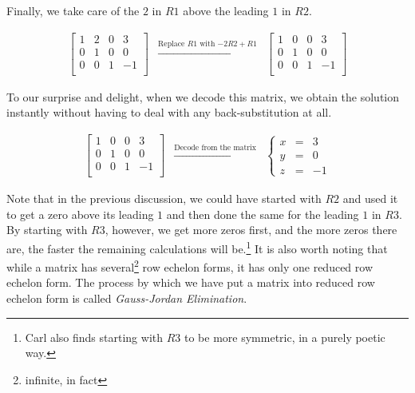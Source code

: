 Finally, we take care of the $2$ in $R1$ above the leading $1$ in $R2$.

\[ \begin{array}{ccc}

\left[ \begin{array}{rrr|r} 
1 & 2 & 0 & 3 \\ 
0 & 1 & 0 & 0 \\ 
0 & 0 &1 & -1 \\ 
\end{array} \right]   
& 
\xrightarrow{\text{Replace $R1$ with $-2R2+R1$}}
& 
\left[ \begin{array}{rrr|r} 
1 & 0 & 0 & 3 \\ 
0 & 1 & 0 & 0 \\ 
0 & 0 &1 & -1 \\ 
\end{array} \right]  

\end{array}\]

To our surprise and delight, when we decode this matrix, we obtain the solution instantly without having to deal with any back-substitution at all.

\[ \begin{array}{ccc}

\left[ \begin{array}{rrr|r} 
1 & 0 & 0 & 3 \\ 
0 & 1 & 0 & 0 \\ 
0 & 0 &1 & -1 \\ 
\end{array} \right]  
 
& 
\xrightarrow{\text{Decode from the matrix}} 
& 
\left\{ \begin{array}{rcr} 
x & = & 3 \\ 
y & = & 0 \\ 
z & = & -1 \end{array} \right.

\end{array}\]

Note that in the previous discussion, we could have started with $R2$ and used it to get a zero above its leading $1$ and then done the same for the leading $1$ in $R3$.  By starting with $R3$, however, we get more zeros first, and the more zeros there are, the faster the remaining calculations will be.\footnote{Carl also finds starting with $R3$ to be more symmetric, in a purely poetic way.}  It is also worth noting that while a matrix has several\footnote{infinite, in fact} row echelon forms, it has only one reduced row echelon form.  The process by which we have put a matrix into reduced row echelon form is called   \textit{Gauss-Jordan Elimination}.

